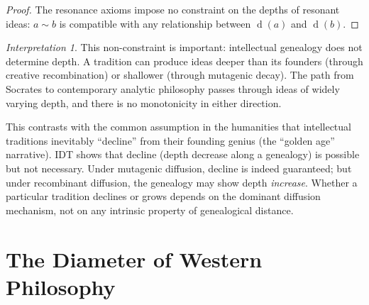 \documentclass[11pt,openany]{book}
\theoremstyle{definition}
\theoremstyle{plain}
\theoremstyle{remark}
\newtheorem{interpretation}[axiom]{Interpretation}
\newcommand{\res}{\sim}                      %
\newcommand{\depth}{\operatorname{d}}       %
\begin{document}
\begin{proof}
The resonance axioms impose no constraint on the depths of resonant ideas: $a \res b$ is compatible with any relationship between $\depth(a)$ and $\depth(b)$.
\end{proof}

\begin{interpretation}
This non-constraint is important: intellectual genealogy does not determine depth. A tradition can produce ideas deeper than its founders (through creative recombination) or shallower (through mutagenic decay). The path from Socrates to contemporary analytic philosophy passes through ideas of widely varying depth, and there is no monotonicity in either direction.

This contrasts with the common assumption in the humanities that intellectual traditions inevitably ``decline'' from their founding genius (the ``golden age'' narrative). IDT shows that decline (depth decrease along a genealogy) is possible but not necessary. Under mutagenic diffusion, decline is indeed guaranteed; but under recombinant diffusion, the genealogy may show depth \emph{increase}. Whether a particular tradition declines or grows depends on the dominant diffusion mechanism, not on any intrinsic property of genealogical distance.
\end{interpretation}

\section{The Diameter of Western Philosophy}
\end{document}
